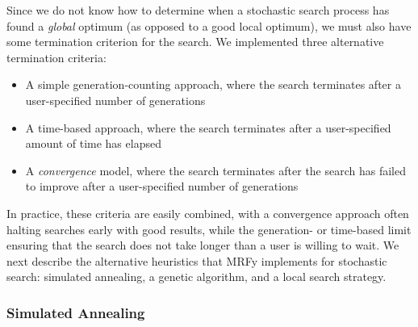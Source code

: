 \documentclass{acm_proc_article-sp}
\begin{document}
\begin{itemize}
\end{itemize}

Since we do not know how to determine when a stochastic search process has found
a \emph{global} optimum (as opposed to a good local optimum), we must also have
some termination criterion for the search.
We implemented three alternative termination criteria:

\begin{itemize}
  \item A simple generation-counting approach, where the search terminates after
  a user-specified number of generations
  \item A time-based approach, where the search terminates after a 
  user-specified amount of time has elapsed
  \item A \emph{convergence} model, where the search terminates after the search
  has failed to improve after a user-specified number of generations
\end{itemize}
  
In practice, these criteria are easily combined, with a convergence approach
often halting searches early with good results, while the generation- or 
time-based limit ensuring that the search does not take longer than a user is
willing to wait.
We next describe the alternative heuristics that MRFy implements for stochastic
search: simulated annealing, a genetic algorithm, and a local search strategy.


\subsubsection{Simulated Annealing}
\end{document}
